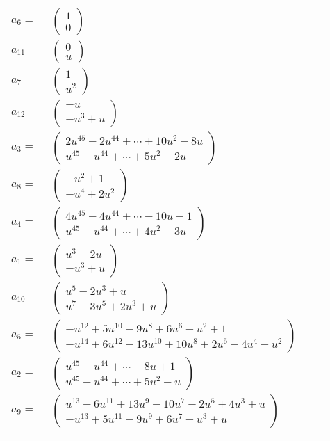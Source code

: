 \documentclass[1p]{elsarticle_modified}
\theoremstyle{definition}
\begin{document}
\begin{tabular}{m{7pt} m{180pt} m{7pt} m{180pt} }
\flushright $a_{6}=$&$\begin{pmatrix}1\\0\end{pmatrix}$ \\
\flushright $a_{11}=$&$\begin{pmatrix}0\\u\end{pmatrix}$ \\
\flushright $a_{7}=$&$\begin{pmatrix}1\\u^2\end{pmatrix}$ \\
\flushright $a_{12}=$&$\begin{pmatrix}- u\\- u^3+u\end{pmatrix}$ \\
\flushright $a_{3}=$&$\begin{pmatrix}2 u^{45}-2 u^{44}+\cdots+10 u^2-8 u\\u^{45}- u^{44}+\cdots+5 u^2-2 u\end{pmatrix}$ \\
\flushright $a_{8}=$&$\begin{pmatrix}- u^2+1\\- u^4+2 u^2\end{pmatrix}$ \\
\flushright $a_{4}=$&$\begin{pmatrix}4 u^{45}-4 u^{44}+\cdots-10 u-1\\u^{45}- u^{44}+\cdots+4 u^2-3 u\end{pmatrix}$ \\
\flushright $a_{1}=$&$\begin{pmatrix}u^3-2 u\\- u^3+u\end{pmatrix}$ \\
\flushright $a_{10}=$&$\begin{pmatrix}u^5-2 u^3+u\\u^7-3 u^5+2 u^3+u\end{pmatrix}$ \\
\flushright $a_{5}=$&$\begin{pmatrix}- u^{12}+5 u^{10}-9 u^8+6 u^6- u^2+1\\- u^{14}+6 u^{12}-13 u^{10}+10 u^8+2 u^6-4 u^4- u^2\end{pmatrix}$ \\
\flushright $a_{2}=$&$\begin{pmatrix}u^{45}- u^{44}+\cdots-8 u+1\\u^{45}- u^{44}+\cdots+5 u^2- u\end{pmatrix}$ \\
\flushright $a_{9}=$&$\begin{pmatrix}u^{13}-6 u^{11}+13 u^9-10 u^7-2 u^5+4 u^3+u\\- u^{13}+5 u^{11}-9 u^9+6 u^7- u^3+u\end{pmatrix}$\\&\end{tabular}
\end{document}
